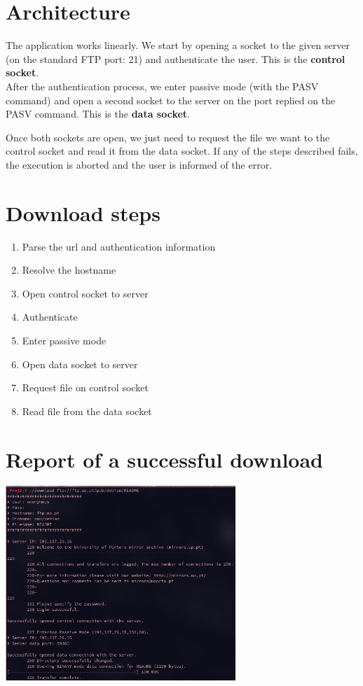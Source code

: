 \documentclass[11pt]{report}
\begin{document}
\section{Architecture}

The application works linearly. We start by opening a socket to the given
server (on the standard FTP port: 21) and authenticate the user. This is
the \textbf{control socket}.\\
After the authentication process, we enter passive mode (with the PASV
command) and open a second socket to the server on the port replied on
the PASV command. This is the \textbf{data socket}.

Once both sockets are open, we just need to request the file
we want to the control socket and read it from the data socket. If any
of the steps described fails, the execution is aborted and the user is
informed of the error.

\section{Download steps}
\begin{enumerate}
\item Parse the url and authentication information
\item Resolve the hostname
\item Open control socket to server
\item Authenticate
\item Enter passive mode
\item Open data socket to server
\item Request file on control socket
\item Read file from the data socket
\end{enumerate}

\section{Report of a successful download}

\includegraphics[width=0.65\textwidth]{images/download_report.png}
\end{document}
